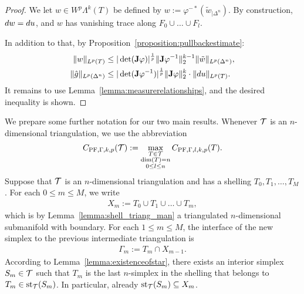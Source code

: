 \documentclass[10pt,a4paper]{article}
\begin{document}
\begin{proof}
    We let $w \in W^{p}\Lambda^{k}(T)$ be defined by $w := \varphi^{-\ast} ( \tilde w_{|\Delta^n} )$.
    By construction, $d w = d u$,
    and $w$ has vanishing trace along $F_{0} \cup \dots \cup F_{l}$.
    
    In addition to that, by Proposition~\ref{proposition:pullbackestimate}:
    \begin{align*}
        \| w \|_{L^{p}(T)}
        &\leq 
        |\det({\mathbf{J}} \varphi)|^{\frac 1 p} 
        \|  {\mathbf{J}} \varphi^{-1}  \|_{2}^{k-1}
        \| \tilde w \|_{L^{p}(\Delta^n)}
        ,
        \\
        \| \hat g \|_{L^{p}(\Delta^n)}
        &\leq 
        |\det( {\mathbf{J}} \varphi^{-1} )|^{\frac 1 p} 
        \| {\mathbf{J}} \varphi \|_{2}^{k}
        \cdot 
        \| d u \|_{L^{p}(T)}
        .
    \end{align*}
    It remains to use Lemma~\ref{lemma:measurerelationships}, and the desired inequality is shown. 
\end{proof}





We prepare some further notation for our two main results. 
Whenever ${\mathcal T}$ is an $n$-dimensional triangulation, we use the abbreviation
\begin{align*}
    C_{{\rm PF},\Gamma,k,p}({\mathcal T}) 
    :=
    \max\limits_{ \substack{ T \in {\mathcal T} \\ \dim(T)=n \\ 0 \leq l \leq n } }
    C_{{\rm PF},\Gamma,l,k,p}(T)
    .
\end{align*}
Suppose that ${\mathcal T}$ is an $n$-dimensional triangulation and has a shelling $T_{0}, T_{1}, \dots, T_{M}$. 
For each $0 \leq m \leq M$, we write 
\begin{align*}
    X_{m} := T_0 \cup T_1 \cup \dots \cup T_{m},
\end{align*}
which is by Lemma~\ref{lemma:shell_triang_man} a triangulated $n$-dimensional submanifold with boundary. 
For each $1 \leq m \leq M$, the interface of the new simplex to the previous intermediate triangulation is 
\begin{align*}
    \Gamma_{m} := T_{m} \cap X_{m-1} %
    .
\end{align*}
According to Lemma~\ref{lemma:existenceofstar}, 
there exists an interior simplex $S_{m} \in {\mathcal T}$ 
such that $T_{m}$ is the last $n$-simplex in the shelling that belongs to $T_{m} \in \operatorname{st}_{{\mathcal T}}(S_{m})$.
In particular, already $\operatorname{st}_{{\mathcal T}}(S_{m}) \subseteq X_{m}$. %
\end{document}

